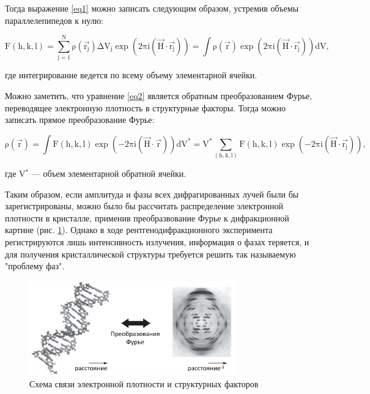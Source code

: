 Тогда выражение \ref{eq1} можно записать следующим образом, устремив объемы параллелепипедов к нулю:

\begin{equation}\label{eq2}
\mathrm{ 
F(h,k,l) = \sum\limits_{j=1}^N \rho(\overrightarrow{r_j})\Delta V_j \exp(2\pi i(\overrightarrow{H}\cdot\overrightarrow{r_j})) = \int\rho(\overrightarrow{r})\exp(2\pi i(\overrightarrow{H}\cdot\overrightarrow{r_j}))dV,}
\end{equation}

где интегрирование ведется по всему объему элементарной ячейки.

Можно заметить, что уравнение \ref{eq2} является обратным преобразованием Фурье, переводящее электронную плотность в структурные факторы. Тогда можно записать прямое преобразование Фурье:

\begin{equation}\label{eq21}
\mathrm{ 
\rho(\overrightarrow{r}) = \int F(h,k,l) \exp (-2\pi i (\overrightarrow{H}\cdot\overrightarrow{r}))dV^* = V^* \sum\limits_{(h,k,l)} F(h,k,l) \exp(-2\pi i (\overrightarrow{H}\cdot\overrightarrow{r_j}))},
\end{equation}

где V$^*$ --- объем элементарной обратной ячейки.

Таким образом, если амплитуда и фазы всех дифрагированных лучей были бы зарегистрированы, можно было бы рассчитать распределение электронной плотности в кристалле, применив преобразвование Фурье к дифракционной картине (рис. \ref{furie}). Однако в ходе рентгенодифракционного эксперимента регистрируются лишь интенсивность излучения, информация о фазах теряется, и для получения кристаллической структуры требуется решить так называемую "проблему фаз".

\begin{figure}[H]
	\centering
	\includegraphics[width=0.8\textwidth]{figures/furie.png}\hfill
	\caption{Схема связи электронной плотности и структурных факторов \cite{girolami_x-ray_2016}}
	\label{furie}
\end{figure}

